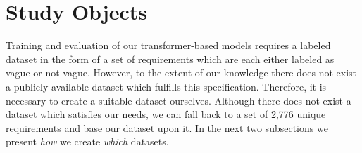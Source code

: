 \section{Study Objects}
\label{chp:study:sec:study_objects}

Training and evaluation of our transformer-based models requires a labeled dataset in the form of a set of requirements which are each either labeled as vague or not vague.
However, to the extent of our knowledge there does not exist a publicly available dataset which fulfills this specification.
Therefore, it is necessary to create a suitable dataset ourselves.
Although there does not exist a dataset which satisfies our needs, we can fall back to a set of 2,776 unique requirements \parencite{Kummeth:2020} and base our dataset upon it.
In the next two subsections we present \textit{how} we create \textit{which} datasets.



